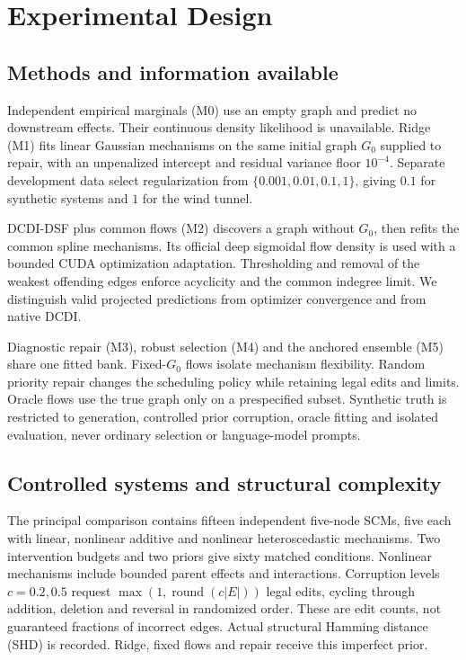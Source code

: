 \documentclass{svproc}
\begin{document}
\section{Experimental Design}
\subsection{Methods and information available}
Independent empirical marginals (M0) use an empty graph and predict no downstream
effects. Their continuous density likelihood is unavailable. Ridge (M1) fits
linear Gaussian mechanisms on the same initial graph $G_0$ supplied to repair,
with an unpenalized intercept and residual variance floor $10^{-4}$. Separate
development data select regularization from $\{0.001,0.01,0.1,1\}$, giving $0.1$
for synthetic systems and $1$ for the wind tunnel.

DCDI-DSF plus common flows (M2) discovers a graph without $G_0$, then refits the common
spline mechanisms. Its official deep sigmoidal flow density is used with a bounded
CUDA optimization adaptation. Thresholding and removal of the weakest offending
edges enforce acyclicity and the common indegree limit. We distinguish valid
projected predictions from optimizer convergence and from native DCDI.

Diagnostic repair (M3), robust selection (M4) and the anchored ensemble (M5) share
one fitted bank. Fixed-$G_0$ flows isolate mechanism flexibility. Random priority
repair changes the scheduling policy while retaining legal edits and limits.
Oracle flows use the true graph only on a prespecified subset. Synthetic truth
is restricted to generation, controlled prior corruption, oracle fitting and
isolated evaluation, never ordinary selection or language-model prompts.


\subsection{Controlled systems and structural complexity}
The principal comparison contains fifteen independent five-node SCMs, five each
with linear, nonlinear additive and nonlinear heteroscedastic mechanisms. Two
intervention budgets and two priors give sixty matched conditions. Nonlinear
mechanisms include bounded parent effects and interactions. Corruption levels
$c=0.2,0.5$ request $\max(1,\operatorname{round}(c|E|))$ legal edits, cycling through
addition, deletion and reversal in randomized order. These are edit counts,
not guaranteed fractions of incorrect edges. Actual structural Hamming distance (SHD) is recorded. Ridge, fixed flows and
repair receive this imperfect prior.
\end{document}
